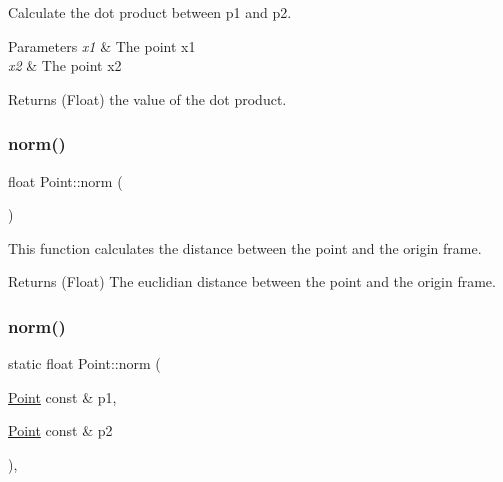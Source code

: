 Calculate the dot product between p1 and p2. 


\begin{DoxyParams}{Parameters}
{\em x1} & The point x1 \\
\hline
{\em x2} & The point x2\\
\hline
\end{DoxyParams}
\begin{DoxyReturn}{Returns}
(Float) the value of the dot product. 
\end{DoxyReturn}
\mbox{\label{struct_point_aadf9f3d612360343f14fc6a23c73bfbd}} 
\subsubsection{\texorpdfstring{norm()}{norm()}\hspace{0.1cm}{\footnotesize\ttfamily [1/2]}}
{\footnotesize\ttfamily float Point\+::norm (\begin{DoxyParamCaption}{ }\end{DoxyParamCaption})\hspace{0.3cm}{\ttfamily [inline]}}



This function calculates the distance between the point and the origin frame. 

\begin{DoxyReturn}{Returns}
(Float) The euclidian distance between the point and the origin frame. 
\end{DoxyReturn}
\mbox{\label{struct_point_ae1e4ca1c92d69fdb5a4c77ddf0a17c9b}} 
\subsubsection{\texorpdfstring{norm()}{norm()}\hspace{0.1cm}{\footnotesize\ttfamily [2/2]}}
{\footnotesize\ttfamily static float Point\+::norm (\begin{DoxyParamCaption}\item[{\mbox{\hyperlink{struct_point}{Point}} const \&}]{p1,  }\item[{\mbox{\hyperlink{struct_point}{Point}} const \&}]{p2 }\end{DoxyParamCaption})\hspace{0.3cm}{\ttfamily [inline]}, {\ttfamily [static]}}




